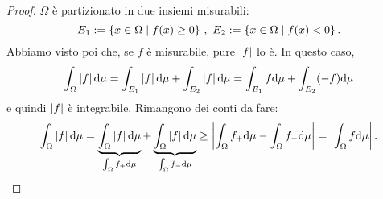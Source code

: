 \begin{proof}
\(\Omega\) è partizionato in due insiemi misurabili:
\[E_1 := \left\{x \in \Omega \mid f(x) \ge 0\right\}\,,\ E_2 := \left\{x \in \Omega \mid f(x) < 0\right\} .\]
Abbiamo visto  poi che, se \(f\) è misurabile, pure \(\left\lvert f\right\rvert\) lo è. In questo caso,
\[\int_\Omega \left\lvert f\right\rvert \mathrm d \mu = \int_{E_1} \left\lvert f\right\rvert \mathrm d \mu + \int_{E_2} \left\lvert f\right\rvert \mathrm d \mu = \int_{E_1} f \mathrm d \mu + \int_{E_2} (-f) \mathrm d \mu\]
e quindi \(\left\lvert f\right\rvert\) è integrabile. Rimangono dei conti da fare:
\[\int_\Omega \left\lvert f\right\rvert \mathrm d \mu = \underbrace{\int_\Omega \left\lvert f\right\rvert \mathrm d \mu}_{\int_\Omega f_+ \mathrm d \mu} + \underbrace{\int_\Omega \left\lvert f\right\rvert \mathrm d \mu}_{\int_\Omega f_- \mathrm d \mu} \ge \left\lvert\int_\Omega f_+ \mathrm d \mu - \int_\Omega f_- \mathrm d \mu\right\rvert = \left\lvert\int_\Omega f \mathrm d \mu\right\rvert .\qedhere\]
\end{proof}

